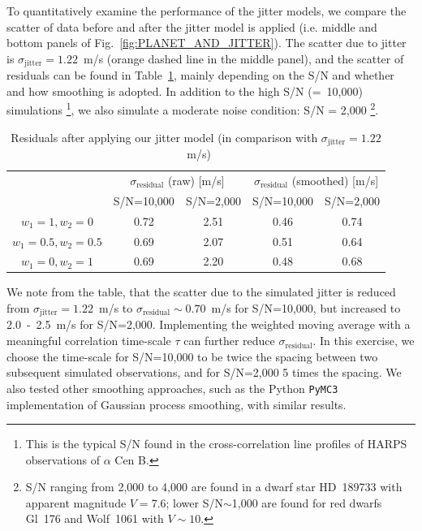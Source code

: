 To quantitatively examine the performance of the jitter models, we compare the scatter of data before and after the jitter model is applied (i.e. middle and bottom panels of Fig.~\ref{fig:PLANET_AND_JITTER}). The scatter due to jitter is $\sigma_\text{jitter} = 1.22$~m/s (orange dashed line in the middle panel), and the scatter of residuals can be found in Table~\ref{table:jitter_model_scatter}, mainly depending on the S/N and whether and how smoothing is adopted. In addition to the high S/N (=~10,000) simulations \footnote{This is the typical S/N found in the cross-correlation line profiles of HARPS observations of $\alpha$ Cen B.}, we also simulate a moderate noise condition: S/N = 2,000 \footnote{S/N ranging from 2,000 to 4,000 are found in a dwarf star HD~189733 with apparent magnitude $V=7.6$; lower S/N$\sim$1,000 are found for red dwarfs Gl~176 and Wolf~1061 with $V\sim10$.}.

\begin{table}[htbp]
\centering
\begin{tabular}{|c|c|c|c|c|}
\hline
\multirow{2}{*}{} 	& \multicolumn{2}{c|}{$\sigma_\text{residual}$ (raw) [m/s]}  & \multicolumn{2}{c|}{$\sigma_\text{residual}$ (smoothed) [m/s]}  \\ \cline{2-5} 
                  	& \multicolumn{1}{l|}{S/N=10,000} & \multicolumn{1}{l|}{S/N=2,000} & \multicolumn{1}{l|}{S/N=10,000} & \multicolumn{1}{l|}{S/N=2,000} \\ \hline
$w_1=1, w_2=0$  	 	& 0.72 		& 2.51 			& 0.46 			& 0.74                              \\ \hline
$w_1=0.5, w_2=0.5$  & 0.69 		& 2.07			& 0.51			& 0.64                              \\ \hline
$w_1=0, w_2=1$      & 0.69		& 2.20			& 0.48 			& 0.68                              \\ \hline
\end{tabular}
\caption{Residuals after applying our jitter model (in comparison with $\sigma_\text{jitter} = 1.22$~m/s)}
\label{table:jitter_model_scatter}
\end{table}

We note from the table, that the scatter due to the simulated jitter is reduced from $\sigma_\text{jitter} = 1.22$~m/s to $\sigma_\text{residual} \sim 0.70$~m/s for S/N=10,000, but increased to 2.0~-~2.5~m/s for S/N=2,000. Implementing the weighted moving average with a meaningful correlation time-scale $\tau$ can further reduce $\sigma_\text{residual}$. In this exercise, we choose the time-scale for S/N=10,000 to be twice the spacing between two subsequent simulated observations, and for S/N=2,000 5 times the spacing. We also tested other smoothing approaches, such as the Python \verb|PyMC3| implementation of Gaussian process smoothing, with similar results. 

